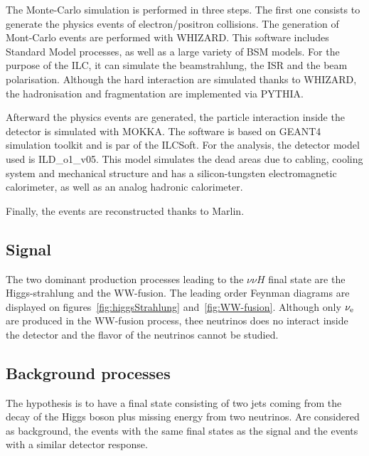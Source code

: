     The Monte-Carlo simulation is performed in three steps.
    The first one consists to generate the physics events of electron/positron collisions.
    The generation of Mont-Carlo events are performed with WHIZARD.
    This software includes Standard Model processes, as well as a large variety of BSM models.
    For the purpose of the \gls{ILC}, it can simulate the beamstrahlung, the \gls{ISR} and the beam polarisation.
    Although the hard interaction are simulated thanks to WHIZARD, the hadronisation and fragmentation are implemented via PYTHIA.
    
    Afterward the physics events are generated, the particle interaction inside the detector is simulated with MOKKA.
    The software is based on GEANT4 simulation toolkit and is par of the ILCSoft.
    For the analysis, the detector model used is ILD\_o1\_v05.
    This model simulates the dead areas due to cabling, cooling system and mechanical structure and has a silicon-tungsten electromagnetic calorimeter, as well as an analog hadronic calorimeter.
    
    Finally, the events are reconstructed thanks to Marlin.

  \subsection{Signal}

   The two dominant production processes leading to the $\nu\nu H$ final state are the Higgs-strahlung and the WW-fusion.
   The leading order Feynman diagrams are displayed on figures~\ref{fig:higgsStrahlung} and~\ref{fig:WW-fusion}.
   Although only $\nu_{\rm{e}}$ are produced in the WW-fusion process, thee neutrinos does no interact inside the detector and the flavor of the neutrinos cannot be studied. 



  \subsection{Background processes}

    The hypothesis is to have a final state consisting of two jets coming from the decay of the Higgs boson plus missing energy from two neutrinos.
    Are considered as background, the events with the same final states as the signal and the events with a similar detector response.

